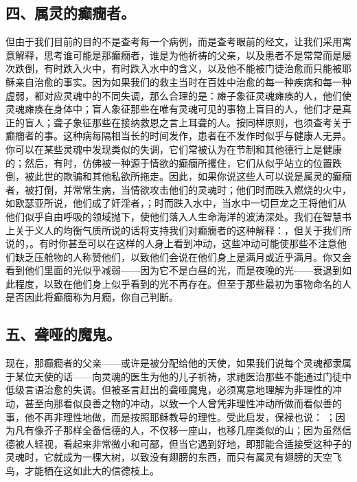 
\subsection{四、属灵的癫癇者。}

但由于我们目前的目的不是查考每一个病例，而是查考眼前的经文，让我们采用寓意解释，思考谁可能是那癫癇者，谁是为他祈祷的父亲，以及患者不是常常而是屡次跌倒，有时跌入火中，有时跌入水中的含义，以及他不能被门徒治愈而只能被耶稣亲自治愈的事实。因为如果我们的救主当时在百姓中治愈的每一种疾病和每一种虚弱，都对应灵魂中的不同失调，那么合理的是：瘫子象征灵魂瘫痪的人，他们使灵魂瘫痪在身体中；盲人象征那些在唯有灵魂可见的事物上盲目的人，他们才是真正的盲人；聋子象征那些在接纳救恩之言上耳聋的人。按同样原则，也须查考关于癫癇者的事。这种病每隔相当长的时间发作，患者在不发作时似乎与健康人无异。你可以在某些灵魂中发现类似的失调，它们常被认为在节制和其他德行上是健康的；然后，有时，仿佛被一种源于情欲的癫癇所攫住，它们从似乎站立的位置跌倒，被此世的欺骗和其他私欲所拖走。因此，如果你说这些人可以说是属灵的癫癇者，被打倒，并常常生病，当情欲攻击他们的灵魂时；他们时而跌入燃烧的火中，如欧瑟亚所说，他们成了奸淫者，；时而跌入水中，当水中一切巨龙之王将他们从他们似乎自由呼吸的领域抛下，使他们落入人生命海洋的波涛深处。我们在智慧书上关于义人的均衡气质所说的话将支持我们对癫癇者的这种解释：，但关于我们所说的，。有时你甚至可以在这样的人身上看到冲动，这些冲动可能使那些不注意他们缺乏压舱物的人称赞他们，以致他们会说在他们身上是满月或近乎满月。你又会看到他们里面的光似乎减弱——因为它不是白昼的光，而是夜晚的光——衰退到如此程度，以致在他们身上似乎看到的光不再存在。但至于那些最初为事物命名的人是否因此将癫癇称为月癇，你自己判断。\par


\subsection{五、聋哑的魔鬼。}

现在，那癫癇者的父亲——或许是被分配给他的天使，如果我们说每个灵魂都隶属于某位天使的话——向灵魂的医生为他的儿子祈祷，求祂医治那些不能通过门徒中低级言语治愈的失调。但被圣言赶出的聋哑魔鬼，必须寓意地理解为非理性的冲动，甚至向那看似良善之物的冲动，以致一个人曾凭非理性冲动所做而看似善的事，他不再非理性地做，而是按照耶稣教导的理性。受此启发，保禄也说： ；因为凡有像芥子那样全备信德的人，不仅移一座山，也移几座类似的山；因为虽然信德被人轻视，看起来非常微小和可鄙，但当它遇到好地，即那能合适接受这种子的灵魂时，它就成为一棵大树，以致没有翅膀的东西，而只有属灵有翅膀的天空飞鸟，才能栖在这如此大的信德枝上。\par

